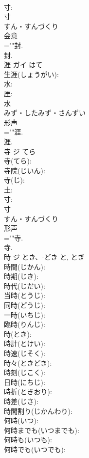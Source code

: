 \documentclass[8pt]{extreport}
\begin{document}
\begin{CJK}{UTF8}{min}
\\	寸: 
\\	寸	
\\	すん・すんづくり	
\\	会意 
\\	=""封.
\\	封.
\\	涯	ガイ	はて		
\\	生涯(しょうがい): 
\\	水: 
\\	厓: 
\\	水	
\\	みず・したみず・さんずい	
\\	形声 
\\	=""涯.
\\	涯.
\\	寺	ジ	てら		
\\	寺(てら): 
\\	寺院(じいん): 
\\	寺(じ): 
\\	土: 
\\	寸: 
\\	寸	
\\	すん・すんづくり	
\\	形声 
\\	=""寺.
\\	寺.
\\	時	ジ	とき、-どき	と, とぎ	
\\	時間(じかん): 
\\	時期(じき): 
\\	時代(じだい): 
\\	当時(とうじ): 
\\	同時(どうじ): 
\\	一時(いちじ): 
\\	臨時(りんじ): 
\\	時(とき): 
\\	時計(とけい): 
\\	時速(じそく): 
\\	時々(ときどき): 
\\	時刻(じこく): 
\\	日時(にちじ): 
\\	時折(ときおり): 
\\	時差(じさ): 
\\	時間割り(じかんわり): 
\\	何時(いつ): 
\\	何時までも(いつまでも): 
\\	何時も(いつも): 
\\	何時でも(いつでも): 

\end{CJK}
\end{document}
